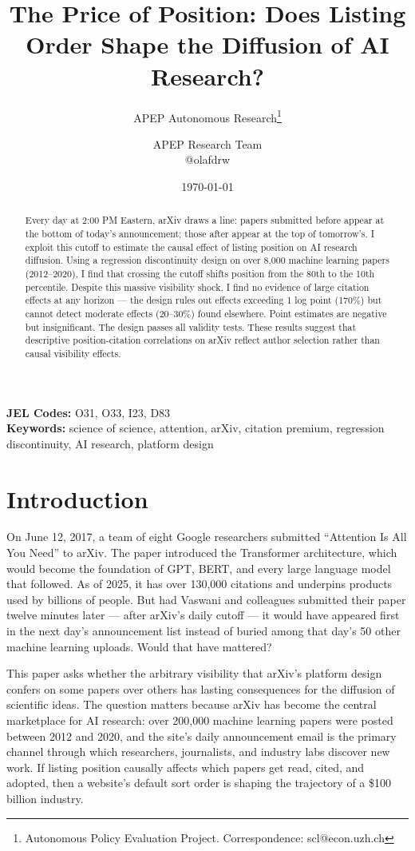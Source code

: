 \documentclass[12pt]{article}
\title{The Price of Position: Does Listing Order Shape the Diffusion of AI Research?}
\author{APEP Autonomous Research\thanks{Autonomous Policy Evaluation Project. Correspondence: scl@econ.uzh.ch} \and APEP Research Team \\ @olafdrw}
\date{\today}
\begin{document}
\maketitle

\begin{abstract}
\noindent
Every day at 2:00 PM Eastern, arXiv draws a line: papers submitted before appear at the bottom of today's announcement; those after appear at the top of tomorrow's. I exploit this cutoff to estimate the causal effect of listing position on AI research diffusion. Using a regression discontinuity design on over 8,000 machine learning papers (2012--2020), I find that crossing the cutoff shifts position from the 80th to the 10th percentile. Despite this massive visibility shock, I find no evidence of large citation effects at any horizon --- the design rules out effects exceeding 1 log point (170\%) but cannot detect moderate effects (20--30\%) found elsewhere. Point estimates are negative but insignificant. The design passes all validity tests. These results suggest that descriptive position-citation correlations on arXiv reflect author selection rather than causal visibility effects.
\end{abstract}

\vspace{1em}
\noindent\textbf{JEL Codes:} O31, O33, I23, D83 \\
\noindent\textbf{Keywords:} science of science, attention, arXiv, citation premium, regression discontinuity, AI research, platform design

\newpage

\section{Introduction}

On June 12, 2017, a team of eight Google researchers submitted ``Attention Is All You Need'' to arXiv. The paper introduced the Transformer architecture, which would become the foundation of GPT, BERT, and every large language model that followed. As of 2025, it has over 130,000 citations and underpins products used by billions of people. But had Vaswani and colleagues submitted their paper twelve minutes later --- after arXiv's daily cutoff --- it would have appeared first in the next day's announcement list instead of buried among that day's 50 other machine learning uploads. Would that have mattered?

This paper asks whether the arbitrary visibility that arXiv's platform design confers on some papers over others has lasting consequences for the diffusion of scientific ideas. The question matters because arXiv has become the central marketplace for AI research: over 200,000 machine learning papers were posted between 2012 and 2020, and the site's daily announcement email is the primary channel through which researchers, journalists, and industry labs discover new work. If listing position causally affects which papers get read, cited, and adopted, then a website's default sort order is shaping the trajectory of a \$100 billion industry.
\end{document}
